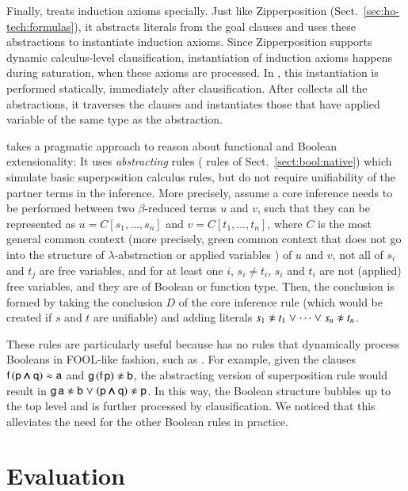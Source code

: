   Finally, \ehohii{} treats induction axioms specially. Just like
  Zipperposition (Sect.~\ref{sec:ho-tech:formulas}), it abstracts literals
  from the goal clauses and uses these abstractions to instantiate induction
  axioms. Since Zipperposition supports dynamic calculus-level clausification,
  instantiation of induction axioms happens during saturation, when these axioms
  are processed. In \ehohii{}, this instantiation is performed statically,
  immediately after clausification. After \ehohii{} collects all the abstractions,
  it traverses the clauses and instantiates those that have applied variable of
  the same type as the abstraction.
  
   \ehohii{} takes a pragmatic approach to reason about
  functional and Boolean extensionality: It uses \emph{abstracting} rules ( rules of Sect.~\ref{sect:bool:native}) 
  which simulate basic superposition calculus rules,
  but do not require unifiability of the partner terms in the inference. More
  precisely, assume a core inference needs to be performed between two
  $\beta$-reduced terms $u$ and $v$, such that they can be represented as
  $u=C[s_1, \ldots, s_n]$ and $v=C[t_1, \ldots, t_n]$, where $C$ is the most general
  common context (more precisely, green common context that does not go into the structure of $\lambda$-abstraction or applied variables \cite{bbtvw-21-sup-lam}) of $u$ and $v$, not all of
  $s_i$ and $t_j$ are free variables, and for at least one $i$, $s_i \not= t_i$,
  $s_i$ and $t_i$ are not (applied) free variables, and they are of Boolean or
  function type. Then, the conclusion is formed by taking the conclusion $D$ of
  the core inference rule (which would be created if $s$ and $t$ are unifiable)
  and adding literals $s_1 \noteq t_1 \llor \cdots \llor s_n \noteq t_n$.
  
  These rules are particularly useful because \ehohii{} has no rules that dynamically
  process Booleans in FOOL-like fashion, such as . For example,
  given the clauses $\mathsf{f} \, (\mathsf{p} \pmb{\land} \mathsf{q}) \approx \mathsf{a}$ and
  $\cst{g} \, (\cst{f} \, \cst{p}) \noteq \cst{b}$, the abstracting version of
  superposition rule would result in $\cst{g} \, \cst{a} \noteq \cst{b} \llor (\cst{p}
  \iand \cst{q}) \noteq \cst{p}$. In this way, the Boolean structure bubbles up to
  the top level and is further processed by clausification. We noticed that this
  alleviates the need for the other Boolean rules in practice.

  \section{Evaluation}
  \label{sec:ehoh2:eval}
  
